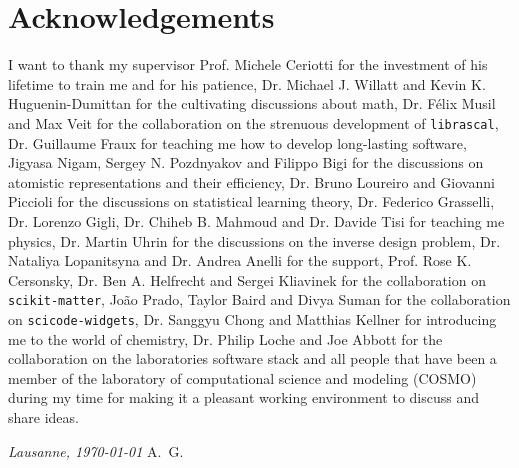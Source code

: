 \chapter*{Acknowledgements}
I want to thank my supervisor Prof. Michele Ceriotti for the investment of his lifetime to train me and for his patience, 
Dr. Michael J. Willatt and Kevin K. Huguenin-Dumittan for the cultivating discussions about math, Dr. Félix Musil and Max Veit for the collaboration on the strenuous development of \texttt{librascal}, Dr. Guillaume Fraux for teaching me how to develop long-lasting software, Jigyasa Nigam, Sergey N. Pozdnyakov and Filippo Bigi for the discussions on atomistic representations and their efficiency, Dr. Bruno Loureiro and Giovanni Piccioli for the discussions on statistical learning theory, Dr. Federico Grasselli, Dr. Lorenzo Gigli, Dr. Chiheb B. Mahmoud and Dr. Davide Tisi for teaching me physics, Dr. Martin Uhrin for the discussions on the inverse design problem, Dr. Nataliya Lopanitsyna and Dr. Andrea Anelli for the support, Prof. Rose K. Cersonsky, Dr. Ben A. Helfrecht and Sergei Kliavinek for the collaboration on \texttt{scikit-matter}, João Prado, Taylor Baird and Divya Suman for the collaboration on \texttt{scicode-widgets}, Dr. Sanggyu Chong and Matthias Kellner for introducing me to the world of chemistry, Dr. Philip Loche and Joe Abbott for the collaboration on the laboratories software stack and all people that have been a member of the laboratory of computational science and modeling (COSMO) during my time for making it a pleasant working environment to discuss and share ideas.

%
%
%
%

\bigskip
 
\noindent\textit{Lausanne, \today}
\hfill A.~G.
